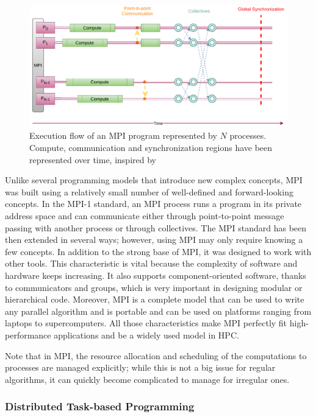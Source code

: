 \begin{figure}[tb]\centering
\includegraphics[scale=0.9]{figures/MPI.pdf}
\caption{Execution flow of an MPI program represented by $N$ processes. Compute, communication and synchronization regions have been represented over time, inspired by~\cite{mpi_report}}
\label{figmpi}
\end{figure}

Unlike several programming models that introduce new complex concepts, MPI was built using a relatively small number of well-defined and forward-looking concepts\cite{traff_recent_2012}. In the MPI-1 standard, an MPI process runs a program in its private address space and can communicate either through point-to-point message passing with another process or through collectives. 
The MPI standard has been then extended in several ways; however, using MPI may only require knowing a few concepts. 
In addition to the strong base of MPI, it was designed to work with other tools. This characteristic is vital because the complexity of software and hardware keeps increasing. It also supports component-oriented software, thanks to communicators and groups, which is very important in designing modular or hierarchical code. Moreover, MPI is a complete model that can be used to write any parallel algorithm and is portable and can be used on platforms ranging from laptops to supercomputers\cite{goos_learning_2001}. All those characteristics make MPI perfectly fit high-performance applications and be a widely used model in HPC.

Note that in MPI, the resource allocation and scheduling of the computations to processes are managed explicitly; while this is not a big issue for regular algorithms, it can quickly become complicated to manage for irregular ones.


\subsubsection{Distributed Task-based Programming}\label{sec:taskbased}

